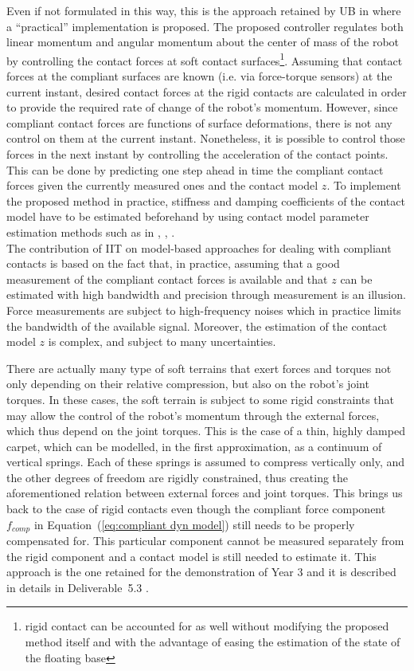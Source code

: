 Even if not formulated in this way, this is the approach retained by UB in \cite{AzadIROS2015} where a ``practical'' implementation is proposed. The proposed controller regulates both linear momentum and angular momentum about the center of mass of the robot by controlling the contact forces at soft contact surfaces\footnote{rigid contact can be accounted for as well without modifying the proposed method itself and with the advantage of easing the estimation of the state of the floating base}. Assuming that contact forces at the compliant surfaces are known (i.e. via force-torque sensors) at the current instant, desired contact forces at the rigid contacts are calculated in order to provide the required rate of change of the robot's momentum.  However, since compliant contact forces are functions of surface deformations, there is not  any control on them at the current instant. Nonetheless, it is possible to control those forces in the next instant by controlling the acceleration of the contact points.  This can be done by predicting one step ahead in time the compliant contact forces given the currently measured ones and the contact model $z$. To implement the proposed method in practice, stiffness and damping coefficients of the contact model have to be estimated beforehand by using contact model parameter estimation methods such as in \cite{Dallalietal13}, \cite{Diolaitietal05}, \cite{Ericksonetal03}.\\


The contribution of IIT on model-based approaches for dealing with compliant contacts is based on the fact that, in practice, assuming that a good measurement of the compliant contact forces is available and that $z$ can be estimated with high bandwidth and precision through measurement is an illusion. Force measurements are subject to high-frequency noises which in practice limits the bandwidth of the available signal. Moreover, the estimation of the contact model $z$ is complex, and subject to many uncertainties.

There are actually many type of soft terrains that exert forces and torques not only depending on their relative compression, but also on the robot’s joint torques. In these cases, the soft terrain is subject to some rigid constraints that may allow the control of the robot's momentum through the external forces, which thus depend on the joint torques. This is the case of a thin, highly damped carpet, which can be modelled, in the first approximation, as a continuum of vertical springs. Each of these springs is assumed to compress vertically only, and the other degrees of freedom are rigidly constrained, thus creating the aforementioned relation between external forces and joint torques. This brings us back to the case of rigid contacts even though the compliant force component $f_{comp}$ in Equation~(\ref{eq:compliant dyn model}) still needs to be properly compensated for. This particular component cannot be measured separately from the rigid component and a contact model is still needed to estimate it. This approach is the one retained for the demonstration of Year 3 and it is described in details in Deliverable~5.3 \cite{deliverable53}.

